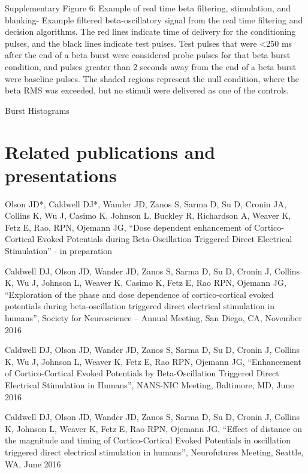 Supplementary Figure 6: Example of real time beta filtering, stimulation, and blanking- Example filtered beta-oscillatory signal from the real time filtering and decision algorithms. The red lines indicate time of delivery for the conditioning pulses, and the black lines indicate test pulses. Test pulses that were <250 ms after the end of a beta burst were considered probe pulses for that beta burst condition, and pulses greater than 2 seconds away from the end of a beta burst were baseline pulses. The shaded regions represent the null condition, where the beta RMS was exceeded, but no stimuli were delivered as one of the controls. 

Burst Histograms


\section{Related publications and presentations}

\noindent Olson JD*, Caldwell DJ*, Wander JD,  Zanos S, Sarma D, Su D, Cronin JA, Collins K, Wu J, Casimo K, Johnson L, Buckley R, Richardson A, Weaver K, Fetz E, Rao, RPN, Ojemann JG, “Dose dependent enhancement of Cortico-Cortical Evoked Potentials during Beta-Oscillation Triggered Direct Electrical Stimulation” - in preparation\\
\medskip

\noindent Caldwell DJ, Olson JD, Wander JD,  Zanos S, Sarma D, Su D, Cronin J, Collins K, Wu J, Johnson L, Weaver K,  Casimo K, Fetz E, Rao RPN, Ojemann JG, “Exploration of the phase and dose dependence of cortico-cortical evoked potentials during beta-oscillation triggered direct electrical stimulation in humans”, Society for Neuroscience – Annual Meeting, San Diego, CA, November 2016 \\
\medskip

\noindent Caldwell DJ, Olson JD, Wander JD,  Zanos S, Sarma D, Su D, Cronin J, Collins K, Wu J, Johnson L, Weaver K, Fetz E, Rao RPN, Ojemann JG, “Enhancement of Cortico-Cortical Evoked Potentials by Beta-Oscillation Triggered Direct Electrical Stimulation in Humans”, NANS-NIC Meeting, Baltimore, MD, June 2016\\
\medskip

\noindent Caldwell DJ, Olson JD, Wander JD, Zanos S, Sarma D, Su D, Cronin J, Collins K, Johnson L, Weaver K, Fetz E, Rao RPN, Ojemann JG, “Effect of distance on the magnitude and timing of Cortico-Cortical Evoked Potentials in oscillation triggered direct electrical stimulation in humans”, Neurofutures Meeting, Seattle, WA, June 2016 \\
\medskip 
